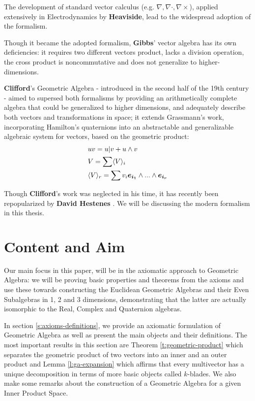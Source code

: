 The development of standard vector calculus (e.g. $\nabla, \nabla \cdot, \nabla \times$), applied extensively in Electrodynamics by \textbf{Heaviside}, lead to the widespread adoption of the formalism.

Though it became the adopted formalism, \textbf{Gibbs}' vector algebra has its own deficiencies: it requires two different vectors product, lacks a division operation, the cross product is noncommutative and does not generalize to higher-dimensions.

\textbf{Clifford}'s  Geometric Algebra - introduced in the second half of the 19th century - aimed to supersed both formalisms by providing an arithmetically complete algebra that could be generalized to higher dimensions, and adequately describe both vectors and transformations in space; it extends Grassmann's work, incorporating Hamilton's quaternions into an abstractable and generalizable algebraic system for vectors, based on the geometric product:
\begin{align*}
    &uv = u | v + u \wedge v\\
    &V = \sum \langle V\rangle_i\\
    &\langle V \rangle_{r} = \sum v_i\boldsymbol{e_{i_1}}\wedge ... \wedge \boldsymbol{e_{i_r}}
\end{align*}

Though \textbf{Clifford}'s work was neglected in his time, it has recently been repopularized by \textbf{David Hestenes} \cite{ga-origin}. We will be discussing the modern formalism in this thesis.

\newpage

\section{Content and Aim}

Our main focus in this paper, will be in the axiomatic approach to Geometric Algebra: we will be proving basic properties and theorems from the axioms and use these towards constructing the Euclidean Geometric Algebras and their Even Subalgebras in 1, 2 and 3 dimensions, demonstrating that the latter are actually isomorphic to the Real, Complex and Quaternion algebras.

In section \ref{s:axioms-definitions}, we provide an axiomatic formulation of Geometric Algebra as well as present the main objects and their definitions. The most important results in this section are Theorem \ref{t:geometric-product} which separates the geometric product of two vectors into an inner and an outer product and Lemma \ref{l:ga-expansion} which affirms that every multivector has a unique decomposition in terms of more basic objects called $k$-blades. We also make some remarks about the construction of a Geometric Algebra for a given Inner Product Space.

